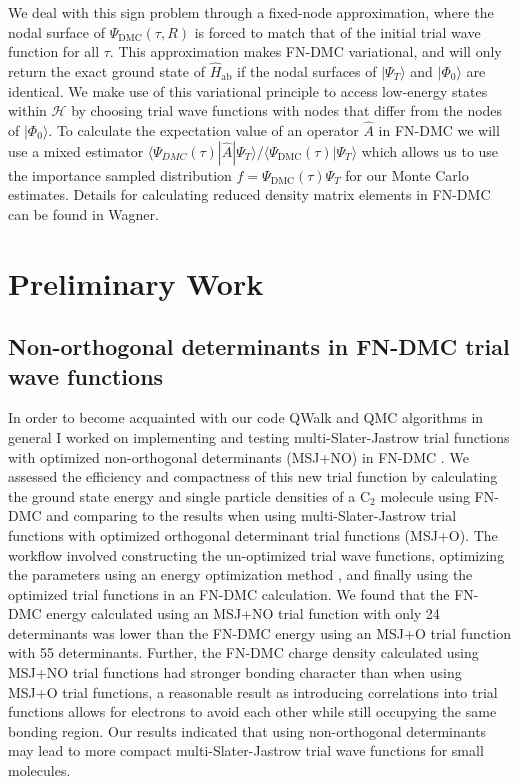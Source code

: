 \documentclass[12pt]{article}
\begin{document}
We deal with this sign problem through a fixed-node approximation, where the nodal surface of $\Psi_\text{DMC}(\tau, R)$ is forced to match that of the initial trial wave function for all $\tau$.
This approximation makes FN-DMC variational, and will only return the exact ground state of $\hat{H}_\text{ab}$ if the nodal surfaces of $|\Psi_T\rangle$ and $|\Phi_0\rangle$ are identical.
We make use of this variational principle to access low-energy states within $\mathcal{H}$ by choosing trial wave functions with nodes that differ from the nodes of $|\Phi_0 \rangle$.
To calculate the expectation value of an operator $\hat{A}$ in FN-DMC we will use a mixed estimator $\langle \Psi_{DMC}(\tau) |\hat{A} | \Psi_T \rangle/\langle \Psi_\text{DMC}(\tau) | \Psi_T \rangle$ which allows us to use the importance sampled distribution $f = \Psi_\text{DMC}(\tau)\Psi_T$ for our Monte Carlo estimates.
Details for calculating reduced density matrix elements in FN-DMC can be found in Wagner.

\section{Preliminary Work}
\subsection{Non-orthogonal determinants in FN-DMC trial wave functions}
In order to become acquainted with our code QWalk \cite{WAGNER20093390} and QMC algorithms in general I worked on implementing and testing multi-Slater-Jastrow trial functions with optimized non-orthogonal determinants (MSJ+NO) in FN-DMC \cite{Pathak2018}.
We assessed the efficiency and compactness of this new trial function by calculating the ground state energy and single particle densities of a C$_2$ molecule using FN-DMC and comparing to the results when using multi-Slater-Jastrow trial functions with optimized orthogonal determinant trial functions (MSJ+O). 
The workflow involved constructing the un-optimized trial wave functions, optimizing the parameters using an energy optimization method \cite{Toulouse2007}, and finally using the optimized trial functions in an FN-DMC calculation. 
We found that the FN-DMC energy calculated using an MSJ+NO trial function with only 24 determinants was lower than the FN-DMC energy using an MSJ+O trial function with 55 determinants. 
Further, the FN-DMC charge density calculated using MSJ+NO trial functions had stronger bonding character than when using MSJ+O trial functions, a reasonable result as introducing correlations into trial functions allows for electrons to avoid each other while still occupying the same bonding region. 
Our results indicated that using non-orthogonal determinants may lead to more compact multi-Slater-Jastrow trial wave functions for small molecules.
\end{document}
